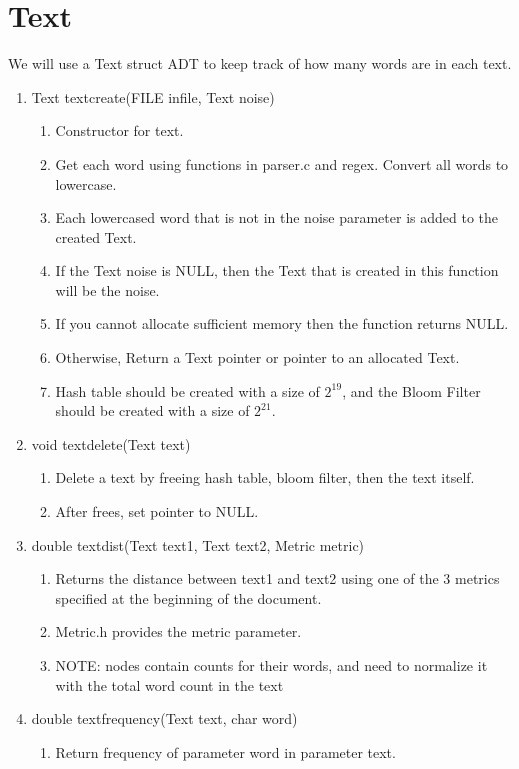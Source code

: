 \documentclass[11pt]{article}
\begin{document}
\section{Text}\label{ss:text}
We will use a Text struct ADT to keep track of how many words are in each text.
\begin{enumerate}
\item Text textcreate(FILE infile, Text noise)
	\begin{enumerate}
	\item Constructor for text.
	\item Get each word using functions in parser.c and regex. Convert all words to lowercase.
	\item Each lowercased word that is not in the noise parameter is added to the created Text.
	\item If the Text noise is NULL, then the Text that is created in this function will be the noise.
	\item If you cannot allocate sufficient memory then the function returns NULL.
	\item Otherwise, Return a Text pointer or pointer to an allocated Text.
	\item Hash table should be created with a size of \(2^{19}\), and the Bloom Filter should be created with a size of \(2^{21}\).
	\end{enumerate}
\item void textdelete(Text text)
	\begin{enumerate}
	\item Delete a text by freeing hash table, bloom filter, then the text itself.
	\item After frees, set pointer to NULL.
	\end{enumerate}
\item double textdist(Text text1, Text text2, Metric metric)
	\begin{enumerate}
	\item Returns the distance between text1 and text2 using one of the 3 metrics specified at the beginning of the document.
	\item Metric.h provides the metric parameter.
	\item NOTE: nodes contain counts for their words, and need to normalize it with the total word count in the text
	\end{enumerate}
\item double textfrequency(Text text, char word)
	\begin{enumerate}
	\item Return frequency of parameter word in parameter text. 

\end{enumerate}
\end{enumerate}
\end{document}
